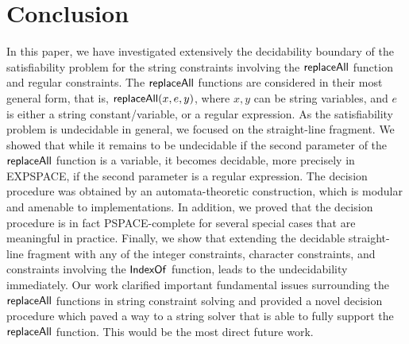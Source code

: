 
\section{Conclusion}

In this paper, we have investigated extensively the decidability boundary of the satisfiability problem for the string constraints involving the $\mathsf{replaceAll}$ function and regular constraints. The $\mathsf{replaceAll}$ functions are considered in their most general form, that is, $\mathsf{replaceAll}(x, e, y)$, where $x,y$ can be string variables, and $e$ is either a string constant/variable, or a regular expression. As the satisfiability problem is undecidable in general, we focused on the straight-line fragment. We showed that while it remains to be undecidable if the second parameter of the $\mathsf{replaceAll}$ function is a variable, it becomes decidable, more precisely in EXPSPACE, if the second parameter is a regular expression. The decision procedure was obtained by an automata-theoretic construction, which is modular and amenable to implementations. In addition, we proved that the decision procedure is in fact PSPACE-complete for several special cases that are meaningful in practice. Finally, we show that extending the decidable straight-line fragment with any of the integer constraints, character constraints, and constraints involving the $\mathsf{IndexOf}$ function, leads to the undecidability immediately. 
Our work clarified important fundamental issues surrounding the $\mathsf{replaceAll}$ functions in string constraint solving and provided a novel decision procedure which paved a way to a string solver that is able to fully support the $\mathsf{replaceAll}$ function. This would be the most direct future work. 